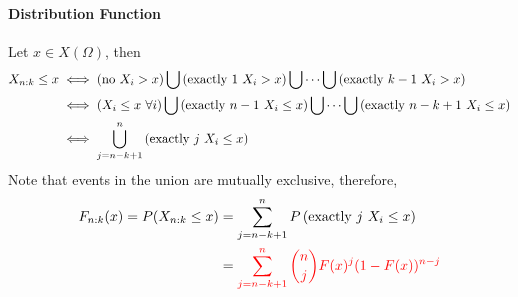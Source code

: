 \documentclass{article}
\begin{document}
	\paragraph{Distribution Function} Let $x \in X(\Omega)$, then 
	\begin{align}
		X_{n:k} \leq x
		&\iff (\text{{no $X_i > x$}}) \bigcup \left(\text{{exactly $1$ $X_i > x$}}\right) \bigcup  \cdots \bigcup \left(\text{{exactly $k-1$ $X_i > x$}}\right) \\
		&\iff (X_i \leq x\ \forall i) \bigcup \left(\text{{exactly $n-1$ $X_i \leq x$}}\right) \bigcup  \cdots \bigcup \left(\text{{exactly $n-k+1$ $X_i \leq x$}}\right) \\
		&\iff \bigcup_{j=n-k+1}^n \left(\text{{exactly $j$ $X_i \leq x$}}\right)
	\end{align}
	Note that events in the union are mutually exclusive, therefore,
	\begin{align}
		F_{n:k}(x) = P(X_{n:k} \leq x)
		&= \sum_{j=n-k+1}^n P\left(\text{{exactly $j$ $X_i \leq x$}}\right) \\
		&= \textcolor{red}{\sum_{j=n-k+1}^n \binom{n}{j} F(x)^j (1 - F(x))^{n-j}}
	\end{align}
\end{document}
